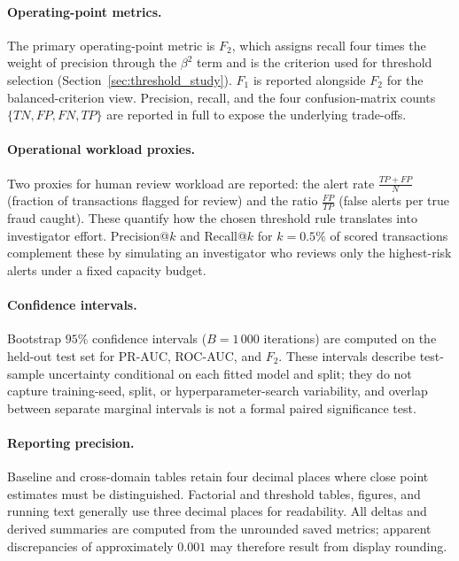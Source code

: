 \paragraph{Operating-point metrics.}
The primary operating-point metric is $F_2$, which assigns recall four times the weight of precision through the $\beta^2$ term and is the criterion used for threshold selection (Section~\ref{sec:threshold_study}). $F_1$ is reported alongside $F_2$ for the balanced-criterion view. Precision, recall, and the four confusion-matrix counts $\{TN, FP, FN, TP\}$ are reported in full to expose the underlying trade-offs.

\paragraph{Operational workload proxies.}
Two proxies for human review workload are reported: the alert rate $\frac{TP+FP}{N}$ (fraction of transactions flagged for review) and the ratio $\frac{FP}{TP}$ (false alerts per true fraud caught). These quantify how the chosen threshold rule translates into investigator effort. Precision@$k$ and Recall@$k$ for $k=0.5\%$ of scored transactions complement these by simulating an investigator who reviews only the highest-risk alerts under a fixed capacity budget.

\paragraph{Confidence intervals.}
Bootstrap $95\%$ confidence intervals ($B{=}1\,000$ iterations) are computed on the held-out test set for PR-AUC, ROC-AUC, and $F_2$. These intervals describe test-sample uncertainty conditional on each fitted model and split; they do not capture training-seed, split, or hyperparameter-search variability, and overlap between separate marginal intervals is not a formal paired significance test.

\paragraph{Reporting precision.}
Baseline and cross-domain tables retain four decimal places where close point estimates must be distinguished. Factorial and threshold tables, figures, and running text generally use three decimal places for readability. All deltas and derived summaries are computed from the unrounded saved metrics; apparent discrepancies of approximately $0.001$ may therefore result from display rounding.

